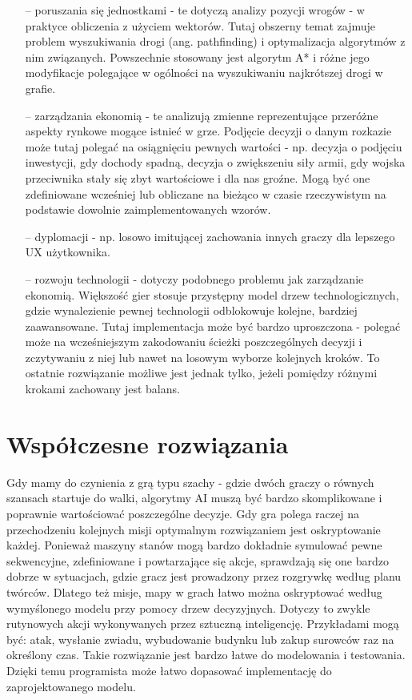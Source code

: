 \documentclass[12pt]{report}
\begin{document}
\begin{itemize}
\item[--] poruszania się jednostkami - te dotyczą analizy pozycji wrogów - w praktyce obliczenia z użyciem wektorów. Tutaj obszerny temat zajmuje problem wyszukiwania drogi (ang. pathfinding) i optymalizacja algorytmów z nim związanych. Powszechnie stosowany jest algorytm A* i różne jego modyfikacje polegające w ogólności na wyszukiwaniu najkrótszej drogi w grafie. 
\item[--] zarządzania ekonomią - te analizują zmienne reprezentujące przeróżne aspekty rynkowe mogące istnieć w grze. Podjęcie decyzji o danym rozkazie może tutaj polegać na osiągnięciu pewnych wartości - np. decyzja o podjęciu inwestycji, gdy dochody spadną, decyzja o zwiększeniu siły armii, gdy wojska przeciwnika stały się zbyt wartościowe i dla nas groźne. Mogą być one zdefiniowane wcześniej lub obliczane na bieżąco w czasie rzeczywistym na podstawie dowolnie zaimplementowanych wzorów.
\item[--] dyplomacji - np. losowo imitującej zachowania innych graczy dla lepszego UX użytkownika.
\item[--] rozwoju technologii - dotyczy podobnego problemu jak zarządzanie ekonomią. Większość gier stosuje przystępny model drzew technologicznych, gdzie wynalezienie pewnej technologii odblokowuje kolejne, bardziej zaawansowane. Tutaj implementacja może być bardzo uproszczona - polegać może na wcześniejszym zakodowaniu ścieżki poszczególnych decyzji i zczytywaniu z niej lub nawet na losowym wyborze kolejnych kroków. To ostatnie rozwiązanie możliwe jest jednak tylko, jeżeli pomiędzy różnymi krokami zachowany jest balans.
\end{itemize}


\section {Współczesne rozwiązania} 
Gdy mamy do czynienia z grą typu szachy - gdzie dwóch graczy o równych szansach startuje do walki, algorytmy AI muszą być bardzo skomplikowane i poprawnie wartościować poszczególne decyzje. Gdy gra polega raczej na przechodzeniu kolejnych misji optymalnym rozwiązaniem jest oskryptowanie każdej. Ponieważ maszyny stanów mogą bardzo dokładnie symulować pewne sekwencyjne, zdefiniowane i powtarzające się akcje, sprawdzają się one bardzo dobrze w sytuacjach, gdzie gracz jest prowadzony przez rozgrywkę według planu twórców. Dlatego też misje, mapy w grach łatwo można oskryptować według wymyślonego modelu przy pomocy drzew decyzyjnych. Dotyczy to zwykle rutynowych akcji wykonywanych przez sztuczną inteligencję. Przykładami mogą być: atak, wysłanie zwiadu, wybudowanie budynku lub zakup surowców raz na określony czas. Takie rozwiązanie jest bardzo łatwe do modelowania i testowania. Dzięki temu programista może łatwo dopasować implementację do zaprojektowanego modelu. 
\end{document}
